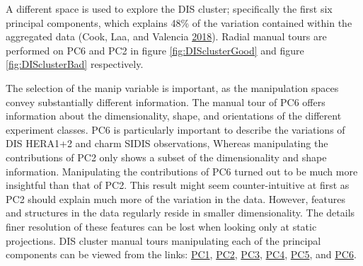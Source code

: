A different space is used to explore the DIS cluster; specifically the
first six principal components, which explains 48\% of the variation
contained within the aggregated data (Cook, Laa, and Valencia
\protect\hyperlink{ref-cook_dynamical_2018}{2018}). Radial manual tours
are performed on PC6 and PC2 in figure \ref{fig:DISclusterGood} and
figure \ref{fig:DISclusterBad} respectively.

The selection of the manip variable is important, as the manipulation
spaces convey substantially different information. The manual tour of
PC6 offers information about the dimensionality, shape, and orientations
of the different experiment classes. PC6 is particularly important to
describe the variations of DIS HERA1+2 and charm SIDIS observations,
Whereas manipulating the contributions of PC2 only shows a subset of the
dimensionality and shape information. Manipulating the contributions of
PC6 turned out to be much more insightful than that of PC2. This result
might seem counter-intuitive at first as PC2 should explain much more of
the variation in the data. However, features and structures in the data
regularly reside in smaller dimensionality. The details finer resolution
of these features can be lost when looking only at static projections.
DIS cluster manual tours manipulating each of the principal components
can be viewed from the links:
\href{https://nspyrison.netlify.com/thesis/discluster_manualtour_pc1/}{PC1},
\href{https://nspyrison.netlify.com/thesis/discluster_manualtour_pc2/}{PC2},
\href{https://nspyrison.netlify.com/thesis/discluster_manualtour_pc3/}{PC3},
\href{https://nspyrison.netlify.com/thesis/discluster_manualtour_pc4/}{PC4},
\href{https://nspyrison.netlify.com/thesis/discluster_manualtour_pc5/}{PC5},
and
\href{https://nspyrison.netlify.com/thesis/discluster_manualtour_pc6/}{PC6}.

